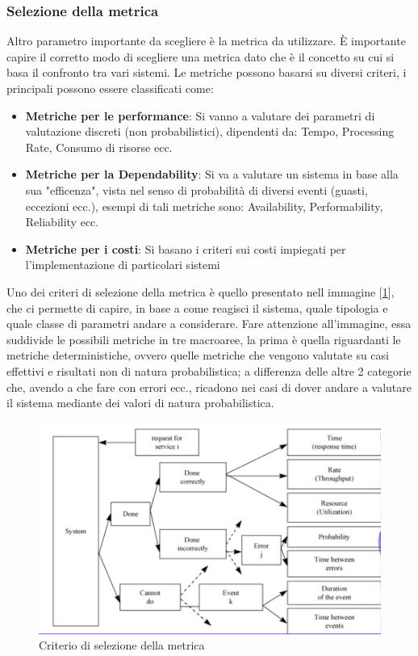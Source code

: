 \subsubsection{Selezione della metrica}
Altro parametro importante da scegliere è la metrica da utilizzare. \uppercase{è} importante capire il corretto modo di scegliere una metrica dato che è il concetto su cui si basa il confronto tra vari sistemi. Le metriche possono basarsi su diversi criteri, i principali possono essere classificati come:
\begin{itemize}
    \item \textbf{Metriche per le performance}: Si vanno a valutare dei parametri di valutazione discreti (non probabilistici), dipendenti da: Tempo, Processing Rate, Consumo di risorse ecc.
    
    \item \textbf{Metriche per la Dependability}: Si va a valutare un sistema in base alla sua "efficenza", vista nel senso di probabilità di diversi eventi (guasti, eccezioni ecc.), esempi di tali metriche sono: Availability, Performability, Reliability ecc.
     
    \item \textbf{Metriche per i costi}: Si basano i criteri sui costi impiegati per l'implementazione di particolari sistemi
\end{itemize}

Uno dei criteri di selezione della metrica è quello presentato nell immagine [\ref{img:criterio-metrica}], che ci permette di capire, in base a come reagisci il sistema, quale tipologia e quale classe di parametri andare a considerare. Fare attenzione all'immagine, essa suddivide le possibili metriche in tre macroaree, la prima è quella riguardanti le metriche deterministiche, ovvero quelle metriche che vengono valutate su casi effettivi e risultati non di natura probabilistica; a differenza delle altre 2 categorie che, avendo a che fare con errori ecc., ricadono nei casi di dover andare a valutare il sistema mediante dei valori di natura probabilistica.

\begin{figure}
    \includegraphics[width=.8\textwidth]{img/Metrics.png}
    \centering
    \caption{Criterio di selezione della metrica}\label{img:criterio-metrica}
\end{figure}


